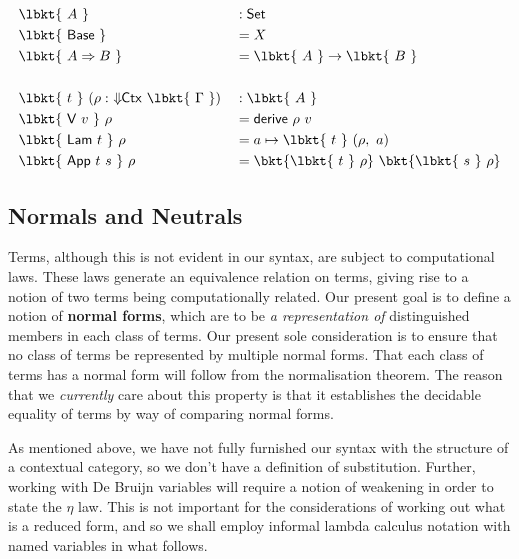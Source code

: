 \begin{align*}
& \lbkt{~A~} & &: \mathsf{Set} \\
& \lbkt{~\mathsf{Base}~} & &= X \\
& \lbkt{~A \Rightarrow B~} & &= \lbkt{~A~} \to\lbkt{~B~} \\
\\
& \lbkt{~t~}~(\rho :~ \Downarrow\!\!\mathsf{Ctx}~\lbkt{~\Gamma~}) & &: \lbkt{~A~} \\
& \lbkt{~\mathsf{V}~v~}~\rho & &= \mathsf{derive}~\rho~v \\
& \lbkt{~\mathsf{Lam}~t~}~\rho & &= a \mapsto \lbkt{~t~}~(\rho,~a) \\
& \lbkt{~\mathsf{App}~t~s~}~\rho & &= \bkt{\lbkt{~t~}~\rho}~\bkt{\lbkt{~s~}~\rho}
\end{align*}

\subsection{Normals and Neutrals}

Terms, although this is not evident in our syntax, are subject to computational
laws. These laws generate an equivalence relation on terms, giving rise to
a notion of two terms being computationally related. Our present goal is to
define a notion of \textbf{normal forms}, which are to be \emph{a representation
of} distinguished members in each class of terms. Our present sole consideration
is to ensure that no class of terms be represented by multiple normal forms.
That each class of terms has a normal form will follow from the normalisation
theorem. The reason that we \emph{currently} care about this property is that it
establishes the decidable equality of terms by way of comparing normal forms.

As mentioned above, we have not fully furnished our syntax with the structure
of a contextual category, so we don't have a definition of substitution.
Further, working with De Bruijn variables will require a notion of weakening
in order to state the $\eta$ law. This is not important for the considerations
of working out what is a reduced form, and so we shall employ informal lambda
calculus notation with named variables in what follows.

